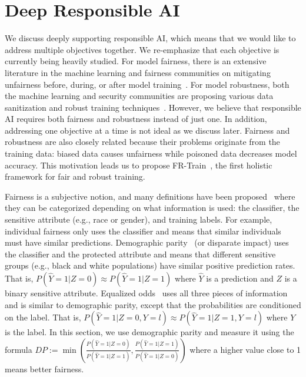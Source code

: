 \documentclass[11pt]{article}
\newcommand{\frtrain}{FR-Train}
\begin{document}
\section{Deep Responsible AI}
\label{sec:depth}

We discuss deeply supporting responsible AI, which means that we would like to address multiple objectives together. We re-emphasize that each objective is currently being heavily studied. For model fairness, there is an extensive literature in the machine learning and fairness communities on mitigating unfairness before, during, or after model training~\cite{barocas-hardt-narayanan,DBLP:conf/pods/Venkatasubramanian19,aif360-oct-2018}. For model robustness, both the machine learning and security communities are proposing various data sanitization and robust training techniques~\cite{DBLP:journals/corr/abs-1811-00741,DBLP:journals/corr/abs-2007-08199}. However, we believe that responsible AI requires both fairness and robustness instead of just one. In addition, addressing one objective at a time is not ideal as we discuss later. Fairness and robustness are also closely related because their problems originate from the training data: biased data causes unfairness while poisoned data decreases model accuracy. This motivation leads us to propose \frtrain{}~\cite{DBLP:conf/icml/RohLWS20}, the first holistic framework for fair and robust training.

Fairness is a subjective notion, and many definitions have been proposed~\cite{DBLP:conf/pods/Venkatasubramanian19} where they can be categorized depending on what information is used: the classifier, the sensitive attribute (e.g., race or gender), and training labels. For example, individual fairness only uses the classifier and means that similar individuals must have similar predictions. Demographic parity~\cite{DBLP:conf/kdd/FeldmanFMSV15} (or disparate impact) uses the classifier and the protected attribute and means that different sensitive groups (e.g., black and white populations) have similar positive prediction rates. That is, $P(\hat{Y}=1|Z=0) \approx P(\hat{Y}=1|Z=1)$ where $\hat{Y}$ is a prediction and $Z$ is a binary sensitive attribute. Equalized odds~\cite{DBLP:conf/nips/HardtPNS16} uses all three pieces of information and is similar to demographic parity, except that the probabilities are conditioned on the label. That is, $P(\hat{Y}=1|Z=0,Y=l) \approx P(\hat{Y}=1|Z=1,Y=l)$ where $Y$ is the label. In this section, we use demographic parity and measure it using the formula $DP := \min \left( \frac{P(\hat{Y}=1|Z=0)}{P(\hat{Y}=1|Z=1)}, \frac{P(\hat{Y}=1|Z=1)}{P(\hat{Y}=1|Z=0)} \right)$ where a higher value close to 1 means better fairness.
\end{document}
